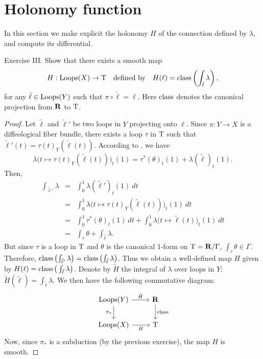\section{Holonomy function}

In this section we make explicit the holonomy $H$ of the connection defined by $\lambda$,
and compute its differential.

\begin{Article}{Exercise  III.}{}
  Show that there exists a smooth map
  $$%
    H : \Loops(X) \to \Torus
    \quad \mbox{defined by} \quad
    H(\ell) = \Class\left(\int_{\tilde \ell} \lambda\right),
    $$%
  for any $\tilde \ell \in \operatorname{Loops}(Y)$
  such that $\pi\circ \tilde \ell = \ell$.
  Here $\operatorname{class}$ denotes the canonical projection from $\mathbf{R}$ to $\mathrm{T}$.
\end{Article}

\begin{proof}
  Let $\tilde \ell$ and $\tilde \ell'$ be two loops in $Y$ projecting onto $\ell$.
  Since $\pi : Y \to X$ is a diffeological fiber bundle,
  there exists a loop $\tau$ in $\mathrm{T}$ such that $\tilde \ell'(t)=\tau(t)_Y(\tilde \ell(t))$.
  According to \cite[\textsection\,8.37]{PIZ13},
  we have
  $$%
    \lambda\big(t \mapsto \tau(t)_Y(\tilde \ell(t))\big)_t(1) = \tau^*(\theta)_t(1) + \lambda(\tilde \ell)_t(1).
    $$%
  Then,
  \begin{eqnarray*}
    \int_{\tilde \ell'}\lambda & = & \int_0^1 \lambda(\tilde \ell')_t(1)\ dt \\
    & = & \int_0^1 \lambda\big(t \mapsto \tau(t)_Y(\tilde \ell(t))\big)_t(1)\ dt \\
    & = & \int_0^1 \tau^*(\theta)_t(1)\ dt + \int_0^1 \lambda\big(t \mapsto \tilde \ell(t)\big)_t(1)\ dt \\
    & = & \int_\tau \theta + \int_{\tilde \ell} \lambda.
  \end{eqnarray*}
  But since $\tau$ is a loop in $\mathrm{T}$ and $\theta$ is the canonical 1-form on $\mathrm{T} = \mathbf{R}/\Gamma$,
  $\int_\tau \theta \in \Gamma$.
  Therefore,
  $\operatorname{class}\left(\int_{\tilde \ell'}\lambda\right) = \operatorname{class}\left(\int_{\tilde \ell}\lambda\right)$.
  Thus we obtain a well-defined map $H$ given by $H(\ell)=\operatorname{class}\big(\int_{\tilde \ell}\lambda\big)$.
  Denote by $\tilde H$ the integral of $\lambda$ over loops in $Y$:
  $\tilde H(\tilde \ell) = \int_{\tilde \ell}\lambda$.
  We then have the following commutative diagram:
  \[
  \begin{tikzcd}
    \Loops(Y) \arrow{r}{\tilde H} \arrow{d}[swap]{\pi_*}       & \RR  \arrow{d}{\Class} \\
    \Loops(X) \arrow{r}[swap]{H} & \Torus
  \end{tikzcd}
  \]
  Now,
  since $\pi_*$ is a subduction (by the previous exercise),
  the map $H$ is smooth.
\end{proof}


